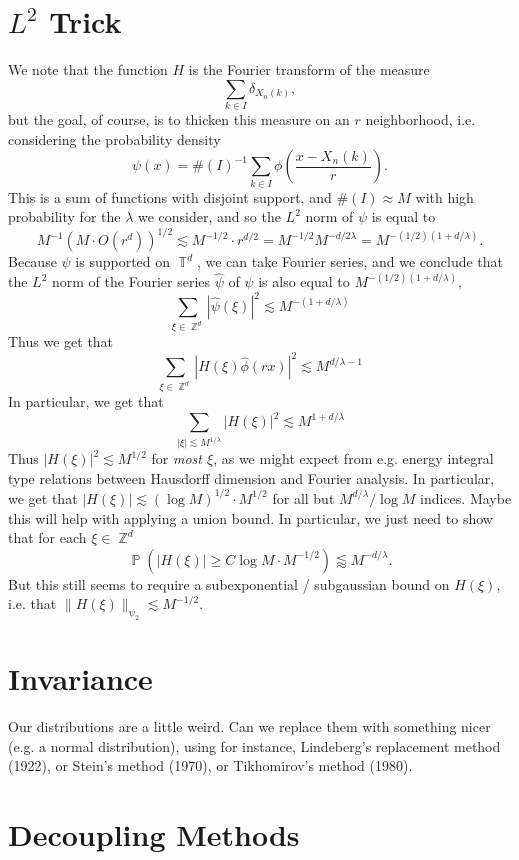 \documentclass[dvipsnames,letterpaper,12pt]{article}
\numberwithin{equation}{section}
\DeclareMathOperator{\ZZ}{\mathbb{Z}}
\DeclareMathOperator{\TT}{\mathbb{T}}
\numberwithin{theorem}{section}
\DeclareMathOperator{\PP}{\mathbb{P}}
\begin{document}
\section{$L^2$ Trick}
We note that the function $H$ is the Fourier transform of the measure
%
\[ \sum_{k \in I} \delta_{X_n(k)}, \]
%
but the goal, of course, is to thicken this measure on an $r$ neighborhood, i.e. considering the probability density
%
\[ \psi(x) = \#(I)^{-1} \sum_{k \in I} \phi \left( \frac{x - X_n(k)}{r} \right). \]
%
This is a sum of functions with disjoint support, and $\#(I) \approx M$ with high probability for the $\lambda$ we consider, and so the $L^2$ norm of $\psi$ is equal to
\[ M^{-1} \left( M \cdot O(r^d) \right)^{1/2} \lesssim M^{-1/2} \cdot r^{d/2} = M^{-1/2} M^{-d/2 \lambda} = M^{-(1/2)(1 + d/\lambda)}. \]
%
Because $\psi$ is supported on $\TT^d$, we can take Fourier series, and we conclude that the $L^2$ norm of the Fourier series $\widehat{\psi}$ of $\psi$ is also equal to $M^{-(1/2)(1 + d/\lambda)}$,
%
\[ \sum_{\xi \in \ZZ^d} |\widehat{\psi}(\xi)|^2 \lesssim M^{-(1 + d/\lambda)} \]
%
Thus we get that
%
\[ \sum_{\xi \in \ZZ^d} \left| H(\xi) \widehat{\phi} \left( r x \right) \right|^2 \lesssim M^{d/\lambda-1} \]
%
In particular, we get that
%
\[ \sum_{|\xi| \lesssim M^{1/\lambda}} |H(\xi)|^2 \lesssim M^{1 + d/\lambda} \]
%
Thus $|H(\xi)|^2 \lesssim M^{1/2}$ for \emph{most $\xi$}, as we might expect from e.g. energy integral type relations between Hausdorff dimension and Fourier analysis. In particular, we get that $|H(\xi)| \lesssim (\log M)^{1/2} \cdot M^{1/2}$ for all but $M^{d/\lambda} / \log M$ indices. Maybe this will help with applying a union bound. In particular, we just need to show that for each $\xi \in \ZZ^d$
%
\[ \PP \left( |H(\xi)| \geq C \log M \cdot M^{-1/2} \right) \lessapprox M^{-d/\lambda}. \]
%
But this still seems to require a subexponential / subgaussian bound on $H(\xi)$, i.e. that $\| H(\xi) \|_{\psi_2} \lesssim M^{-1/2}$.


\section{Invariance}

Our distributions are a little weird. Can we replace them with something nicer (e.g. a normal distribution), using for instance, Lindeberg's replacement method (1922), or Stein's method (1970), or Tikhomirov's method (1980).

\section{Decoupling Methods}
\end{document}
